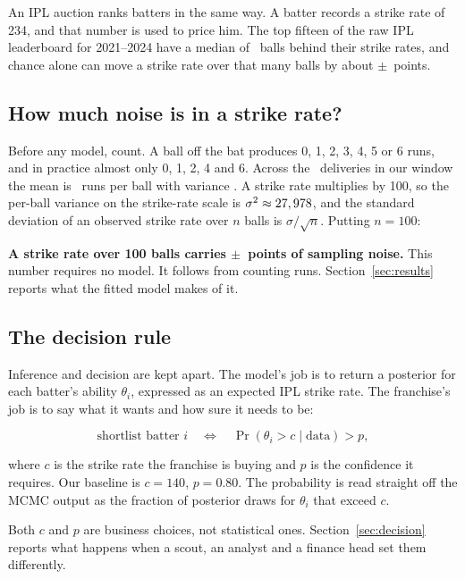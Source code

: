 \documentclass[11pt,a4paper]{article}
\begin{document}
An IPL auction ranks batters in the same way. A batter records a strike rate of 234, and that
number is used to price him. The top fifteen of the raw IPL leaderboard for 2021--2024 have a
median of \ntopFifteenMedianBalls\ balls behind their strike rates, and chance alone can move
a strike rate over that many balls by about $\pm$\ntopFifteenNoise\ points.

\subsection{How much noise is in a strike rate?}

Before any model, count. A ball off the bat produces 0, 1, 2, 3, 4, 5 or 6 runs, and in
practice almost only 0, 1, 2, 4 and 6. Across the \nNdeliveries\ deliveries in our window the mean
is \nballMean\ runs per ball with variance \nballVar. A strike rate multiplies by 100, so the
per-ball variance on the strike-rate scale is $\sigma^2 \approx 27,978$, and the
standard deviation of an observed strike rate over $n$ balls is $\sigma/\sqrt{n}$. Putting
$n = 100$:

\begin{callout}
\textbf{A strike rate over 100 balls carries $\pm$\nsdHundred\ points of sampling noise.}
This number requires no model. It follows from counting runs. Section~\ref{sec:results} reports
what the fitted model makes of it.
\end{callout}

\subsection{The decision rule}

Inference and decision are kept apart. The model's job is to return a posterior for each
batter's ability $\theta_i$, expressed as an expected IPL strike rate. The franchise's job is
to say what it wants and how sure it needs to be:

\[
\text{shortlist batter } i \quad\Longleftrightarrow\quad
\Pr(\theta_i > c \mid \text{data}) > p,
\]

where $c$ is the strike rate the franchise is buying and $p$ is the confidence it requires.
Our baseline is $c=140$, $p=0.80$. The probability is read straight off the MCMC output as the
fraction of posterior draws for $\theta_i$ that exceed $c$.

Both $c$ and $p$ are business choices, not statistical ones. Section~\ref{sec:decision} reports
what happens when a scout, an analyst and a finance head set them differently.
\end{document}
